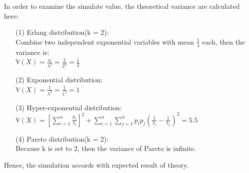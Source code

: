 In order to examine the simulate value, the theoretical variance are calculated here:
\begin{enumerate}
    \item[(1)] Erlang distribution(k = 2):\\
    Combine two independent exponential variables with mean $\frac{1}{\lambda}$ each, then the variance is:\\
    $\mathbb{V}(X)=\frac{n}{\lambda^{2}} = \frac{2}{2^{2}} = \frac{1}{2}$
    
    \item[(2)] Exponential distribution:\\
    $\mathbb{V}(X)=\frac{1}{\lambda^{2}} = \frac{1}{1^2} = 1$ 
    
    \item[(3)] Hyper-exponential distribution:\\
    $\mathbb{V}(X) = \left[\sum_{i=1}^{n} \frac{p_{i}}{\lambda_{i}}\right]^{2}+\sum_{i=1}^{n} \sum_{j=1}^{n} p_{i} p_{j}\left(\frac{1}{\lambda_{i}}-\frac{1}{\lambda_{j}}\right)^{2}
    = 5.5$
    
    \item[(4)] Pareto distribution(k = 2):\\
    Because k is set to 2, then the variance of Pareto is infinite.
    
    
    
\end{enumerate}

Hence, the simulation accords with expected result of theory.









\newpage